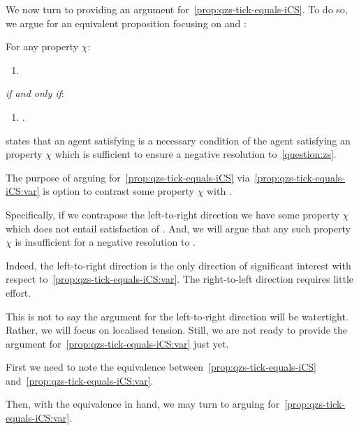\begin{note}
  We now turn to providing an argument for~\autoref{prop:qzs-tick-equals-iCS}.
  To do so, we argue for an equivalent proposition focusing on \qzS{} and \zetaS{}:

  \begin{proposition}
    \label{prop:qzs-tick-equals-iCS:var}
    For any property \(\chi\):
    \begin{enumerate}[label=\Alph*.]
    \item
      \label{squish:A}
    \end{enumerate}
    \emph{if and only if}:
    \begin{enumerate}[label=\Alph*.,resume]
    \item
      \label{squish:B}
      .
    \end{enumerate}
    \vspace{-\baselineskip}
  \end{proposition}

   states that an agent satisfying \izetaS{} is a necessary condition of the agent satisfying an property \(\chi\) which is sufficient to ensure a negative resolution to~\autoref{question:zs}.

  The purpose of arguing for~\autoref{prop:qzs-tick-equals-iCS} via~\autoref{prop:qzs-tick-equals-iCS:var} is option to contrast some property \(\chi\) with \zetaS{}.

  Specifically, if we contrapose the left-to-right direction we have some property \(\chi\) which does not entail satisfaction of \izetaS{}.
  And, we will argue that any such property \(\chi\) is insufficient for a negative resolution to \qzS{}.

  Indeed, the left-to-right direction is the only direction of significant interest with respect to~\autoref{prop:qzs-tick-equals-iCS:var}.
  The right-to-left direction requires little effort.

  This is not to say the argument for the left-to-right direction will be watertight.
  Rather, we will focus on localised tension.
  Still, we are not ready to provide the argument for~\autoref{prop:qzs-tick-equals-iCS:var} just yet.

  First we need to note the equivalence between~\autoref{prop:qzs-tick-equals-iCS} and~\autoref{prop:qzs-tick-equals-iCS:var}.

  Then, with the equivalence in hand, we may turn to arguing for~\autoref{prop:qzs-tick-equals-iCS:var}.
\end{note}

